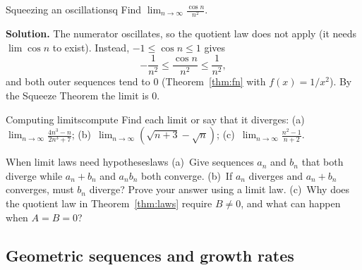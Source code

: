 \documentclass[11pt]{article}
\begin{document}
\begin{exmp}{Squeezing an oscillation}{sq}
Find $\displaystyle\lim_{n\to\infty}\frac{\cos n}{n^2}$.

\textbf{Solution.} The numerator oscillates, so the quotient law does not apply (it needs $\lim\cos n$ to exist). Instead, $-1\le\cos n\le1$ gives
\[
-\frac1{n^2}\le\frac{\cos n}{n^2}\le\frac1{n^2},
\]
and both outer sequences tend to $0$ (Theorem~\ref{thm:fn} with $f(x)=1/x^2$). By the Squeeze Theorem the limit is $0$.
\end{exmp}

\begin{kc}{Computing limits}{compute}
Find each limit or say that it diverges: (a)~$\displaystyle\lim_{n\to\infty}\frac{4n^3-n}{2n^3+7}$; \quad (b)~$\displaystyle\lim_{n\to\infty}\left(\sqrt{n+3}-\sqrt n\right)$; \quad (c)~$\displaystyle\lim_{n\to\infty}\frac{n^2-1}{n+2}$.
\end{kc}

\begin{think}{When limit laws need hypotheses}{laws}
(a)~Give sequences $a_n$ and $b_n$ that both diverge while $a_n+b_n$ and $a_nb_n$ both converge. (b)~If $a_n$ diverges and $a_n+b_n$ converges, must $b_n$ diverge? Prove your answer using a limit law. (c)~Why does the quotient law in Theorem~\ref{thm:laws} require $B\ne0$, and what can happen when $A=B=0$?
\end{think}

\subsection*{Geometric sequences and growth rates}
\end{document}
